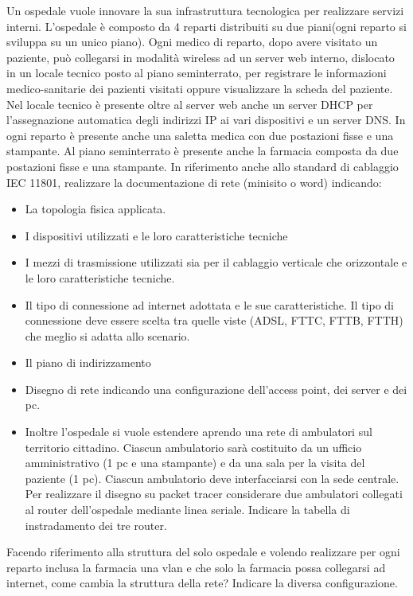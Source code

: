 Un ospedale vuole innovare la sua infrastruttura tecnologica per realizzare servizi interni. L’ospedale è
composto da 4 reparti distribuiti su due piani(ogni reparto si sviluppa su un unico piano). Ogni medico di
reparto, dopo avere visitato un paziente, può collegarsi in modalità wireless ad un server web interno,
dislocato in un locale tecnico posto al piano seminterrato, per registrare le informazioni medico-sanitarie
dei pazienti visitati oppure visualizzare la scheda del paziente. Nel locale tecnico è presente oltre al server
web anche un server DHCP per l’assegnazione automatica degli indirizzi IP ai vari dispositivi e un server
DNS. In ogni reparto è presente anche una saletta medica con due postazioni fisse e una stampante.
Al piano seminterrato è presente anche la farmacia composta da due postazioni fisse e una stampante.
In riferimento anche allo standard di cablaggio IEC 11801, realizzare la documentazione di rete (minisito o
word) indicando:
\begin{itemize}
	\item La topologia fisica applicata.
	\item I dispositivi utilizzati e le loro caratteristiche tecniche
	\item I mezzi di trasmissione utilizzati sia per il cablaggio verticale che orizzontale e le loro caratteristiche tecniche.
	\item Il tipo di connessione ad internet adottata e le sue caratteristiche. Il tipo di connessione deve essere scelta tra quelle viste (ADSL, FTTC, FTTB, FTTH) che meglio si adatta allo scenario.
	\item Il piano di indirizzamento
	\item Disegno di rete indicando una configurazione dell’access point, dei server e dei pc.
	\item Inoltre l’ospedale si vuole estendere aprendo una rete di ambulatori sul territorio cittadino. Ciascun ambulatorio sarà costituito da un ufficio amministrativo (1 pc e una stampante) e da una sala per la visita del paziente (1 pc). Ciascun ambulatorio deve interfacciarsi con la sede centrale. Per realizzare il disegno su packet tracer considerare due ambulatori collegati al router dell’ospedale mediante linea seriale. Indicare la tabella di instradamento dei tre router.
\end{itemize}

Facendo riferimento alla struttura del solo ospedale e volendo realizzare per ogni reparto inclusa la
farmacia una vlan e che solo la farmacia possa collegarsi ad internet, come cambia la struttura della rete?
Indicare la diversa configurazione.